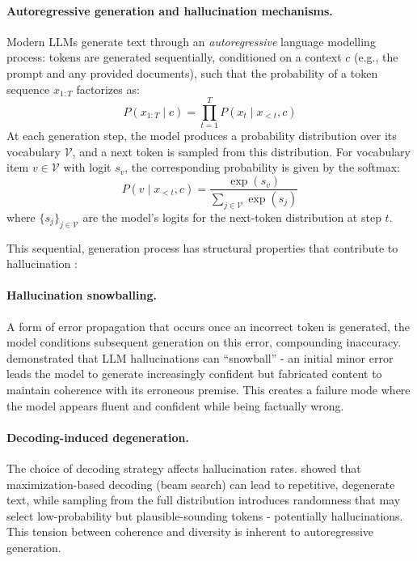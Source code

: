 \paragraph{Autoregressive generation and hallucination mechanisms.} Modern LLMs generate text through an \textit{autoregressive} language modelling process: tokens are generated sequentially, conditioned on a context \(c\) (e.g., the prompt and any provided documents), such that the probability of a token sequence \(x_{1:T}\) factorizes as:
\begin{equation}
P(x_{1:T} \mid c) = \prod_{t=1}^{T} P(x_t \mid x_{<t}, c)
\end{equation}
At each generation step, the model produces a probability distribution over its vocabulary \(\mathcal{V}\), and a next token is sampled from this distribution. For vocabulary item \(v\in\mathcal{V}\) with logit \(s_v\), the corresponding probability is given by the softmax:
\begin{equation}
P(v \mid x_{<t}, c) = \frac{\exp(s_v)}{\sum_{j \in \mathcal{V}} \exp(s_j)}
\end{equation}
where \(\{s_j\}_{j\in\mathcal{V}}\) are the model's logits for the next-token distribution at step \(t\).

This sequential, generation process has structural properties that contribute to hallucination \citep{ji2023survey}:

\paragraph{Hallucination snowballing.} A form of error propagation that occurs once an incorrect token is generated, the model conditions subsequent generation on this error, compounding inaccuracy. \citet{zhang2023language} demonstrated that LLM hallucinations can ``snowball'' - an initial minor error leads the model to generate increasingly confident but fabricated content to maintain coherence with its erroneous premise. This creates a failure mode where the model appears fluent and confident while being factually wrong.

\paragraph{Decoding-induced degeneration.} The choice of decoding strategy affects hallucination rates. \citet{holtzman2020curiouscaseneuraltext} showed that maximization-based decoding (beam search) can lead to repetitive, degenerate text, while sampling from the full distribution introduces randomness that may select low-probability but plausible-sounding tokens - potentially hallucinations. This tension between coherence and diversity is inherent to autoregressive generation.

